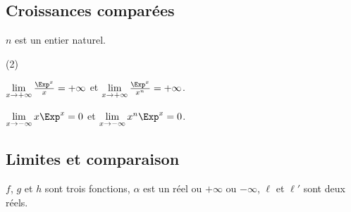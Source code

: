 \subsection{Croissances comparées}

\begin{thr}$n$ est un entier naturel.
\begin{itemize-}(2)
\item $\lim\limits_{x\to +\infty} \frac{\Exp^x}{x}=+\infty$ et  $\lim\limits_{x\to +\infty} \frac{\Exp^x}{x^n}=+\infty$.
\item $\lim\limits_{x\to -\infty}x\Exp^x=0$ et $\lim\limits_{x\to -\infty}x^n\Exp^x=0$.
\end{itemize-}
\end{thr}

\subsection{Limites et comparaison}
\noindent $f$, $g$ et $h$ sont trois fonctions, $\alpha$ est un réel ou $+\infty$ ou $-\infty$, $\ell$ et $\ell'$ sont deux réels.

